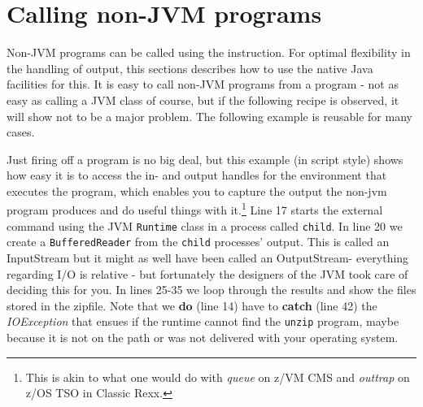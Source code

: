 {%









\chapter{Calling non-JVM programs}
Non-JVM programs can be called using the  instruction.
For optimal flexibility in the handling of output, this sections
describes how to use the native Java facilities for this.
It is easy to call non-JVM programs
from a \nr{} program - not as easy as calling a JVM class of course, but if
the following recipe is observed, it will show not to be a major
problem. The following example is reusable for many cases.
 
Just firing off a program is no big deal, but this example (in script
style) shows how easy it is to access the in- and output handles for
the environment that executes the program, which enables you to
capture the output the non-jvm program produces and do useful things
with it.\footnote{This is akin to what one would do with \emph{queue}
  on z/VM CMS and \emph{outtrap} on z/OS TSO in Classic Rexx.}
Line 17 starts the external command using the JVM \texttt{Runtime}
class in a process called \texttt{child}. In line 20 we create a
\texttt{BufferedReader} from the \texttt{child} processes'
output. This is called an InputStream but it might as well have been
called an OutputStream- everything regarding I/O is relative - but
fortunately the designers of the JVM took care of deciding this for you.
In lines 25-35 we loop through the results and show the files stored
in the zipfile. Note that we \textbf{do} (line 14) have to \textbf{catch} (line
42) the \emph{IOException} that ensues if the runtime cannot find the
\texttt{unzip} program, maybe because it is not on the path or was not
delivered with your operating system. 


}
